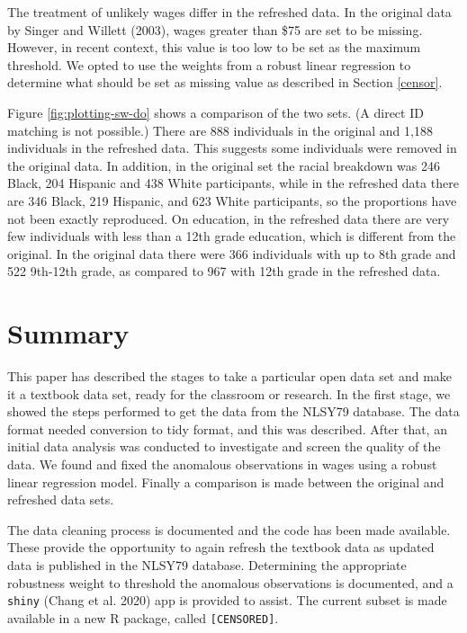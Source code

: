 \documentclass{article}
\begin{document}
The treatment of unlikely wages differ in the refreshed data. In the original data by Singer and Willett (2003), wages greater than \$75 are set to be missing. However, in recent context, this value is too low to be set as the maximum threshold. We opted to use the weights from a robust linear regression to determine what should be set as missing value as described in Section \ref{censor}.

Figure \ref{fig:plotting-sw-do} shows a comparison of the two sets. (A direct ID matching is not possible.) There are 888 individuals in the original and 1,188 individuals in the refreshed data. This suggests some individuals were removed in the original data.
In addition, in the original set the racial breakdown was 246 Black, 204 Hispanic and 438 White participants, while in the refreshed data there are 346 Black, 219 Hispanic, and 623 White participants, so the proportions have not been exactly reproduced. On education, in the refreshed data there are very few individuals with less than a 12th grade education, which is different from the original. In the original data there were 366 individuals with up to 8th grade and 522 9th-12th grade, as compared to 967 with 12th grade in the refreshed data.

\hypertarget{summary}{%
\section{Summary}\label{summary}}

This paper has described the stages to take a particular open data set and make it a textbook data set, ready for the classroom or research. In the first stage, we showed the steps performed to get the data from the NLSY79 database. The data format needed conversion to tidy format, and this was described. After that, an initial data analysis was conducted to investigate and screen the quality of the data. We found and fixed the anomalous observations in wages using a robust linear regression model. Finally a comparison is made between the original and refreshed data sets.

The data cleaning process is documented and the code has been made available. These provide the opportunity to again refresh the textbook data as updated data is published in the NLSY79 database.
Determining the appropriate robustness weight to threshold the anomalous observations is documented, and a \texttt{shiny} (Chang et al. 2020) app is provided to assist.
The current subset is made available in a new R package, called \texttt{[CENSORED]}.
\end{document}
